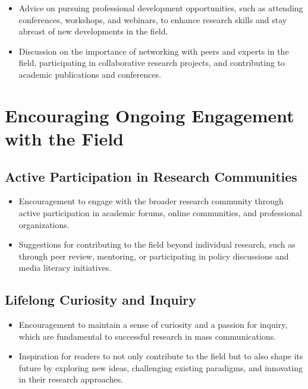 \documentclass[
]{book}
\begin{document}
\begin{itemize}
\item
  Advice on pursuing professional development opportunities, such as attending conferences, workshops, and webinars, to enhance research skills and stay abreast of new developments in the field.
\item
  Discussion on the importance of networking with peers and experts in the field, participating in collaborative research projects, and contributing to academic publications and conferences.
\end{itemize}

\hypertarget{encouraging-ongoing-engagement-with-the-field}{%
\section*{Encouraging Ongoing Engagement with the Field}\label{encouraging-ongoing-engagement-with-the-field}}

\hypertarget{active-participation-in-research-communities}{%
\subsection*{Active Participation in Research Communities}\label{active-participation-in-research-communities}}

\begin{itemize}
\item
  Encouragement to engage with the broader research community through active participation in academic forums, online communities, and professional organizations.
\item
  Suggestions for contributing to the field beyond individual research, such as through peer review, mentoring, or participating in policy discussions and media literacy initiatives.
\end{itemize}

\hypertarget{lifelong-curiosity-and-inquiry}{%
\subsection*{Lifelong Curiosity and Inquiry}\label{lifelong-curiosity-and-inquiry}}

\begin{itemize}
\item
  Encouragement to maintain a sense of curiosity and a passion for inquiry, which are fundamental to successful research in mass communications.
\item
  Inspiration for readers to not only contribute to the field but to also shape its future by exploring new ideas, challenging existing paradigms, and innovating in their research approaches.
\end{itemize}

  
\end{document}
